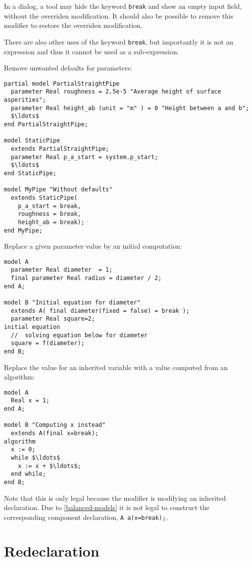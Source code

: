 \begin{nonnormative}
In a dialog, a tool may hide the keyword \lstinline!break! and show an empty input field, without the overriden modification.
It should also be possible to remove this modifier to restore the overriden modification.

There are also other uses of the keyword \lstinline!break!, but importantly it is not an expression and thus it cannot be used as a sub-expression.
\end{nonnormative}

\begin{example}
Remove unwanted defaults for parameters:
\begin{lstlisting}
partial model PartialStraightPipe
  parameter Real roughness = 2.5e-5 "Average height of surface asperities";
  parameter Real height_ab (unit = "m" ) = 0 "Height between a and b";
  $\ldots$
end PartialStraightPipe;

model StaticPipe
  extends PartialStraightPipe;
  parameter Real p_a_start = system.p_start;
  $\ldots$
end StaticPipe;

model MyPipe "Without defaults"
  extends StaticPipe(
    p_a_start = break,
    roughness = break,
    height_ab = break);
end MyPipe;
\end{lstlisting}
Replace a given parameter value by an initial computation:
\begin{lstlisting}
model A
  parameter Real diameter  = 1;
  final parameter Real radius = diameter / 2;
end A;

model B "Initial equation for diameter"
  extends A( final diameter(fixed = false) = break );
  parameter Real square=2;
initial equation
  //  solving equation below for diameter
  square = f(diameter);
end B;
\end{lstlisting}
Replace the value for an inherited variable with a value computed from an algorithm:
\begin{lstlisting}
model A
  Real x = 1;
end A;

model B "Computing x instead"
  extends A(final x=break);
algorithm
  x := 0;
  while $\ldots$
    x := x + $\ldots$;
  end while;
end B;
\end{lstlisting}
Note that this is only legal because the modifier is modifying an inherited declaration.
Due to \cref{balanced-models} it is not legal to construct the corresponding component declaration, \lstinline!A a(x=break);!.
\end{example}


\section{Redeclaration}\label{redeclaration}

